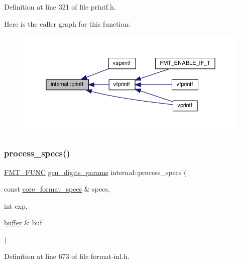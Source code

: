 Definition at line 321 of file printf.\+h.

Here is the caller graph for this function\+:
\nopagebreak
\begin{figure}[H]
\begin{center}
\leavevmode
\includegraphics[width=350pt]{namespaceinternal_adb04322abcec003865318281a6952434_icgraph}
\end{center}
\end{figure}
\mbox{\label{namespaceinternal_ae7e379764ed4a98f3058130ffbca218a}} 
\subsubsection{\texorpdfstring{process\+\_\+specs()}{process\_specs()}}
{\footnotesize\ttfamily \hyperlink{format_8h_a02c8898388e0ae59aab58be14fcd4e05}{F\+M\+T\+\_\+\+F\+U\+NC} \hyperlink{structinternal_1_1gen__digits__params}{gen\+\_\+digits\+\_\+params} internal\+::process\+\_\+specs (\begin{DoxyParamCaption}\item[{const \hyperlink{structcore__format__specs}{core\+\_\+format\+\_\+specs} \&}]{specs,  }\item[{int}]{exp,  }\item[{\hyperlink{namespaceinternal_a5fcdbc3efad1f390e6c3f0fdafa56122}{buffer} \&}]{buf }\end{DoxyParamCaption})}



Definition at line 673 of file format-\/inl.\+h.

